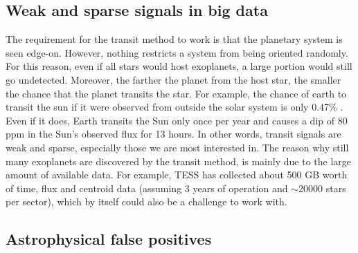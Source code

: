 \subsection{Weak and sparse signals in big data}

The requirement for the transit method to work is that the planetary system is seen edge-on. However, nothing restricts a system from being oriented randomly. For this reason, even if all stars would host exoplanets, a large portion would still go undetected. Moreover, the farther the planet from the host star, the smaller the chance that the planet transits the star. For example, the chance of earth to transit the sun if it were observed from outside the solar system is only 0.47\% \citep{borucki1984photometric}. Even if it does, Earth transits the Sun only once per year and causes a dip of 80 ppm in the Sun’s observed flux for 13 hours. In other words, transit signals are weak and sparse, especially those we are most interested in. The reason why still many exoplanets are discovered by the transit method, is mainly due to the large amount of available data. For example, TESS has collected about 500 GB worth of time, flux and centroid data (assuming 3 years of operation and $\sim$20000 stars per sector), which by itself could also be a challenge to work with.

\subsection{Astrophysical false positives}
\label{sec:astro_false_pos}

